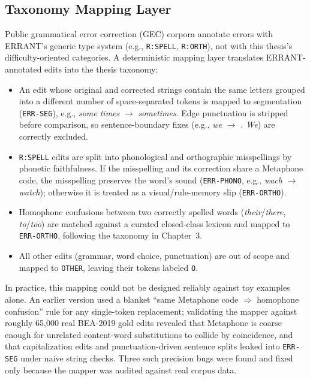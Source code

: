 \subsection{Taxonomy Mapping Layer}
\label{sec:impl_ling_taxmap}

Public grammatical error correction (GEC) corpora annotate errors with ERRANT's generic type system (e.g., \texttt{R:SPELL}, \texttt{R:ORTH}), not with this thesis's difficulty-oriented categories. A deterministic mapping layer translates ERRANT-annotated edits into the thesis taxonomy:

\begin{itemize}
    \item An edit whose original and corrected strings contain the same letters grouped into a different number of space-separated tokens is mapped to segmentation (\texttt{ERR-SEG}), e.g., \emph{some times} $\rightarrow$ \emph{sometimes}. Edge punctuation is stripped before comparison, so sentence-boundary fixes (e.g., \emph{we} $\rightarrow$ \emph{. We}) are correctly excluded.
    \item \texttt{R:SPELL} edits are split into phonological and orthographic misspellings by phonetic faithfulness. If the misspelling and its correction share a Metaphone code, the misspelling preserves the word's sound (\texttt{ERR-PHONO}, e.g., \emph{wach} $\rightarrow$ \emph{watch}); otherwise it is treated as a visual/rule-memory slip (\texttt{ERR-ORTHO}).
    \item Homophone confusions between two correctly spelled words (\emph{their}/\emph{there}, \emph{to}/\emph{too}) are matched against a curated closed-class lexicon and mapped to \texttt{ERR-ORTHO}, following the taxonomy in Chapter~3.
    \item All other edits (grammar, word choice, punctuation) are out of scope and mapped to \texttt{OTHER}, leaving their tokens labeled \texttt{O}.
\end{itemize}

In practice, this mapping could not be designed reliably against toy examples alone. An earlier version used a blanket ``same Metaphone code $\Rightarrow$ homophone confusion'' rule for any single-token replacement; validating the mapper against roughly 65{,}000 real BEA-2019 gold edits \parencite{Bryant2019} revealed that Metaphone is coarse enough for unrelated content-word substitutions to collide by coincidence, and that capitalization edits and punctuation-driven sentence splits leaked into \texttt{ERR-SEG} under naive string checks. Three such precision bugs were found and fixed only because the mapper was audited against real corpus data.

